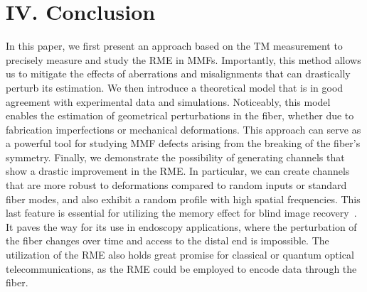 \documentclass[aps,prl,twocolumn, amsmath,amssymb,superscriptaddress]{revtex4-2}
\begin{document}


\section{IV. Conclusion}

In this paper, we first present an approach based on the TM measurement 
to precisely measure and study the RME in MMFs.
Importantly, this method allows us to mitigate the effects of aberrations and misalignments 
that can drastically perturb its estimation. 
We then introduce a theoretical model that is in good agreement with experimental data 
and simulations. 
Noticeably, this model enables the estimation of geometrical perturbations in the fiber, 
whether due to fabrication imperfections or mechanical deformations. 
This approach can serve as a powerful tool for studying MMF defects 
arising from the breaking of the fiber's symmetry. 
Finally, we demonstrate the possibility of generating channels that show
a drastic improvement in the RME. 
In particular, we can create channels that 
are more robust to deformations compared to random inputs or standard fiber modes, 
and also exhibit a random profile with high spatial frequencies. 
This last feature is essential for utilizing the memory effect for blind image recovery~\cite{bertolotti2012non-invasive}.
It paves the way for its use in endoscopy applications, where the perturbation of the fiber changes over time
and access to the distal end is impossible. 
The utilization of the RME also holds great promise for classical or quantum optical telecommunications, 
as the RME could be employed to encode data through the fiber.


\end{document}
